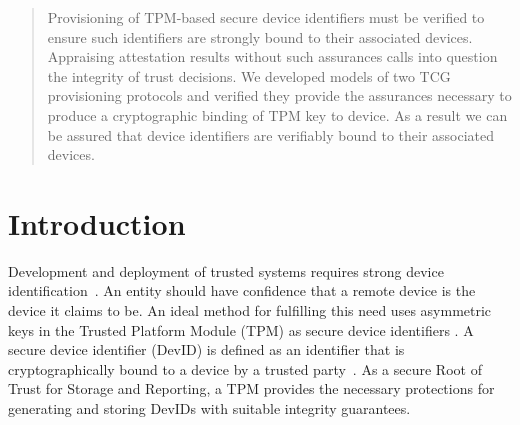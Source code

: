 \documentclass[runningheads]{llncs}
\begin{document}
\begin{abstract}
  Provisioning of TPM-based secure device identifiers must be verified
  to ensure such identifiers are strongly bound to their associated
  devices.  Appraising attestation results without such assurances
  calls into question the integrity of trust decisions.  
  We developed models of two TCG provisioning protocols and verified
  they provide the assurances necessary to produce a cryptographic 
  binding of TPM key to device.
  As a result we can be assured that device
  identifiers are verifiably bound to their associated devices.

\end{abstract}
%
%
%
\section{Introduction}
Development and deployment of trusted systems requires strong device
identification~\citep{Martin:08:The-ten-page-in}. An entity should
have confidence that a remote device is the device it claims to be. An
ideal method for fulfilling this need uses asymmetric keys in the
Trusted Platform Module (TPM) as secure device identifiers
\citep{DevIDSpec-TCG}. A secure device identifier (DevID) is defined
as an identifier that is cryptographically bound to a device by a
trusted party~\citep{DevIDSpec-IEEE}.  As a secure Root of Trust for
Storage and Reporting, a TPM provides the necessary
protections for generating and storing DevIDs with suitable integrity
guarantees.
\end{document}
